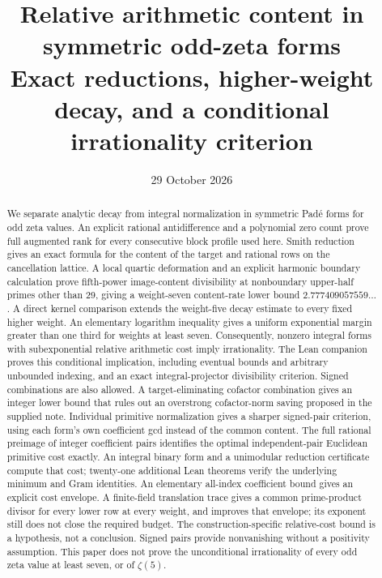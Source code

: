 \documentclass[11pt]{article}
\title{Relative arithmetic content in symmetric odd-zeta forms\\
\large Exact reductions, higher-weight decay, and a conditional irrationality criterion}
\author{}
\date{29 October 2026}
\theoremstyle{remark}
\begin{document}
\maketitle
\begin{abstract}
We separate analytic decay from integral normalization in symmetric Pad\'e
forms for odd zeta values. An explicit rational antidifference and a
polynomial zero count prove full augmented rank for every consecutive
block profile used here. Smith reduction gives an exact formula for the
content of the target and rational rows on the cancellation lattice.
A local quartic deformation and an explicit harmonic boundary calculation
prove fifth-power image-content divisibility at nonboundary upper-half
primes other than 29, giving a weight-seven content-rate lower bound
$2.777409057559\ldots$.
A direct kernel comparison extends the weight-five decay estimate to every
fixed higher weight. An elementary logarithm inequality gives a uniform
exponential margin greater than one third for weights at least seven.
Consequently, nonzero integral forms with subexponential relative arithmetic
cost imply irrationality. The Lean companion proves this conditional
implication, including eventual bounds and arbitrary unbounded indexing,
and an exact integral-projector divisibility criterion.
Signed combinations are also allowed. A target-eliminating cofactor
combination gives an integer lower bound that rules out an overstrong
cofactor-norm saving proposed in the supplied note.
Individual primitive normalization gives a sharper signed-pair criterion,
using each form's own coefficient gcd instead of the common content.
The full rational preimage of integer coefficient pairs identifies the
optimal independent-pair Euclidean primitive cost exactly. An integral
binary form and a unimodular reduction certificate compute that cost;
twenty-one additional Lean theorems verify the underlying minimum and
Gram identities. An elementary all-index coefficient bound gives an
explicit cost envelope. A finite-field translation trace gives a common
prime-product divisor for every lower row at every weight, and improves
that envelope; its exponent still does not close the required budget.
The construction-specific relative-cost bound is a hypothesis, not a
conclusion. Signed pairs provide nonvanishing without a positivity
assumption. This paper does not prove the unconditional irrationality
of every odd zeta value at least seven, or of \(\zeta(5)\).
\end{abstract}
\end{document}
